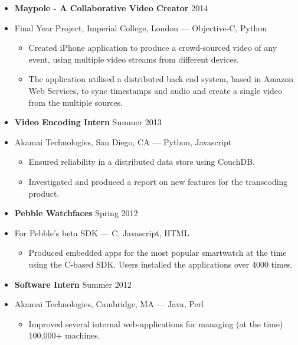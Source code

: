 \documentclass[line,margin]{res}
\newcommand\oindent{0em}
\newcommand\lindent{1.5em}
\newcommand\spacing{0.6em}
\newcommand\si{\item[]}
\newenvironment{secretlist}[1]{\begin{itemize}[noitemsep,leftmargin=#1,nolistsep]}{\end{itemize}}
\begin{document}
\begin{resume}
            \begin{secretlist}{\oindent}
                \si \textbf{Maypole - A Collaborative Video Creator} \hfill 2014
                \si Final Year Project, Imperial College, London --- Objective-C, Python
                \begin{secretlist}{\lindent}
                    \si Created iPhone application to produce a crowd-sourced video of any event, using multiple video streams from different devices.
                    \si The application utilised a distributed back end system, based in Amazon Web Services, to sync timestamps and audio and create a single video from the multiple sources.
                \end{secretlist}
            \end{secretlist}
            \vspace{\spacing}
            \begin{secretlist}{\oindent}
                \si \textbf{Video Encoding Intern} \hfill Summer 2013
                \si Akamai Technologies, San Diego, CA --- Python, Javascript
                \begin{secretlist}{\lindent}
                    \si Ensured reliability in a distributed data store using CouchDB.
                    \si Investigated and produced a report on new features for the transcoding product.
                \end{secretlist}
            \end{secretlist}
            \vspace{\spacing}
            \begin{secretlist}{\oindent}
                \si \textbf{Pebble Watchfaces} \hfill Spring 2012
                \si For Pebble's beta SDK --- C, Javascript, HTML
                \begin{secretlist}{\lindent}
                    \si Produced embedded apps for the most popular smartwatch at the time using the C-based SDK. Users installed the applications over 4000 times.
                \end{secretlist}
            \end{secretlist}
            \vspace{\spacing}
            \begin{secretlist}{\oindent}
                \si \textbf{Software Intern} \hfill Summer 2012
                \si Akamai Technologies, Cambridge, MA --- Java, Perl
                \begin{secretlist}{\lindent}
                    \si Improved several internal web-applications for managing (at the time) 100,000+ machines.

\end{secretlist}
\end{secretlist}
\end{resume}
\end{document}
